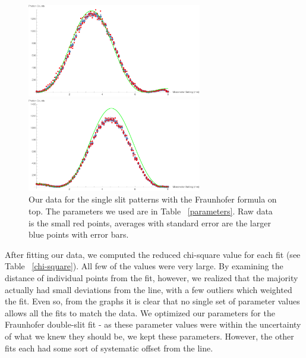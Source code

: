 \documentclass[prb,preprint]{revtex4-1}
\begin{document}
\begin{figure}[h!]
\centering
\begin{minipage}[b]{0.45\linewidth}
	\includegraphics[width=3in]{far_slit_Fresnel_plot.pdf}
\end{minipage}
\quad
\begin{minipage}[b]{0.45\linewidth}
	\includegraphics[width=3in]{near_slit_Fresnel_plot.pdf}
\end{minipage}
\caption{Our data for the single slit patterns with the Fraunhofer formula on top. The parameters we used are in Table ~\ref{parameters}. Raw data is the small red points, averages with standard error are the larger blue points with error bars. }
\label{single_slits_Fresnel_plot}
\end{figure}

After fitting our data, we computed the reduced chi-square value for each fit (see Table ~\ref{chi-square}).  All few of the values were very large.  By examining the distance of individual points from the fit, however, we realized that the majority actually had small deviations from the line, with a few outliers which weighted the fit.  Even so, from the graphs it is clear that no single set of parameter values allows all the fits to match the data.  We optimized our parameters for the Fraunhofer double-slit fit - as these parameter values were within the uncertainty of what we knew they should be, we kept these parameters.  However, the other fits each had some sort of systematic offset from the line.  
\end{document}
